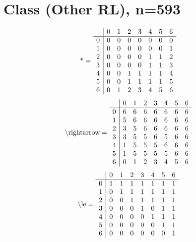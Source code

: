 \documentclass[11pt]{article}
\begin{document}
\section{Class (Other RL), n=593}
\[\text{*} = 
\begin{array}{r | r r r r r r r}
 & 0 & 1 & 2 & 3 & 4 & 5 & 6 \\ \hline
0 & 0 & 0 & 0 & 0 & 0 & 0 & 0 \\
1 & 0 & 0 & 0 & 0 & 0 & 0 & 1 \\
2 & 0 & 0 & 0 & 0 & 1 & 1 & 2 \\
3 & 0 & 0 & 0 & 0 & 1 & 1 & 3 \\
4 & 0 & 0 & 1 & 1 & 1 & 1 & 4 \\
5 & 0 & 0 & 1 & 1 & 1 & 1 & 5 \\
6 & 0 & 1 & 2 & 3 & 4 & 5 & 6 \\
\end{array}
\]
\[\text{\textbackslash rightarrow} = 
\begin{array}{r | r r r r r r r}
 & 0 & 1 & 2 & 3 & 4 & 5 & 6 \\ \hline
0 & 6 & 6 & 6 & 6 & 6 & 6 & 6 \\
1 & 5 & 6 & 6 & 6 & 6 & 6 & 6 \\
2 & 3 & 5 & 6 & 6 & 6 & 6 & 6 \\
3 & 3 & 5 & 5 & 6 & 5 & 6 & 6 \\
4 & 1 & 5 & 5 & 5 & 6 & 6 & 6 \\
5 & 1 & 5 & 5 & 5 & 5 & 6 & 6 \\
6 & 0 & 1 & 2 & 3 & 4 & 5 & 6 \\
\end{array}
\]
\[\text{\textbackslash le} = 
\begin{array}{r | r r r r r r r}
 & 0 & 1 & 2 & 3 & 4 & 5 & 6 \\ \hline
0 & 1 & 1 & 1 & 1 & 1 & 1 & 1 \\
1 & 0 & 1 & 1 & 1 & 1 & 1 & 1 \\
2 & 0 & 0 & 1 & 1 & 1 & 1 & 1 \\
3 & 0 & 0 & 0 & 1 & 0 & 1 & 1 \\
4 & 0 & 0 & 0 & 0 & 1 & 1 & 1 \\
5 & 0 & 0 & 0 & 0 & 0 & 1 & 1 \\
6 & 0 & 0 & 0 & 0 & 0 & 0 & 1 \\
\end{array}
\]
\end{document}
